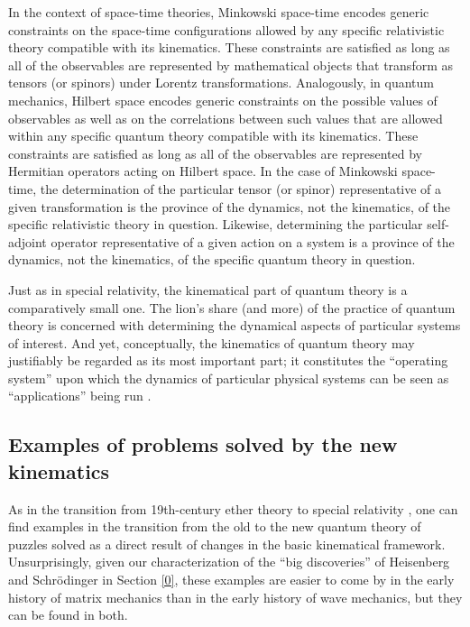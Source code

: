 In the context of space-time theories, Minkowski space-time encodes generic constraints on the space-time configurations allowed by any specific relativistic theory compatible with its kinematics. These constraints are satisfied as long as all of the observables are represented by mathematical objects that transform as tensors (or spinors) under Lorentz transformations. Analogously, in quantum mechanics, Hilbert space encodes generic constraints on the possible values of observables as well as on the correlations between such values that are allowed within any specific quantum theory compatible with its kinematics. These constraints are satisfied as long as all of the observables are represented by Hermitian operators acting on Hilbert space. In the case of Minkowski space-time, the determination of the particular tensor (or spinor) representative of a given transformation is the province of the dynamics, not the kinematics, of the specific relativistic theory in question. Likewise, determining the particular self-adjoint operator representative of a given action on a system is a province of the dynamics, not the kinematics, of the specific quantum theory in question.

Just as in special relativity, the kinematical part of quantum theory is a comparatively small one. The lion's share (and more) of the practice of quantum theory is concerned with determining the dynamical aspects of particular systems of interest. And yet, conceptually, the kinematics of quantum theory may justifiably be regarded as its most important part; it constitutes the ``operating system'' upon which the dynamics of particular physical systems can be seen as ``applications'' being run \citep[p. 2]{Nielsen and Chuang 2016}.

\subsection{Examples of problems solved by the new kinematics}
\label{4.3a}

As in the transition from 19th-century ether theory to special relativity \citep[see][]{Janssen 2009}, one can find examples in the transition from the old to the new quantum theory of puzzles
solved as a direct result of changes in the basic kinematical framework. Unsurprisingly, given our characterization of the ``big discoveries'' of Heisenberg and Schr\"odinger in Section \ref{0}, these examples are easier to come by in the early history of matrix mechanics than in the early history of wave mechanics, but they can be found in both.

